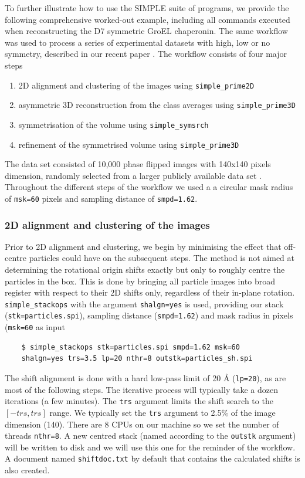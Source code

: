\documentclass[a4paper,11pt]{article}
\newcommand{\prgname}[1]{\textcolor{NavyBlue}{\texttt{#1}}}
\begin{document}
To further illustrate how to use the SIMPLE suite of programs, we provide the following comprehensive worked-out example, including all commands executed when reconstructing the D7 symmetric GroEL chaperonin. The same workflow was used to process a series of experimental datasets with high, low or no symmetry, described in our recent paper \citep{reboul2016stochastic}. The workflow consists of four major steps
\begin{enumerate}
\item 2D alignment and clustering of the images using \prgname{simple\_prime2D}
\item asymmetric 3D reconstruction from the class averages using \prgname{simple\_prime3D}
\item symmetrisation of the volume using \prgname{simple\_symsrch}
\item refinement of the symmetrised volume using \prgname{simple\_prime3D}
\end{enumerate}
The data set consisted of 10,000 phase flipped images with 140x140 pixels dimension, randomly selected from a larger publicly available data set \citep{Stagg:2008aa}. Throughout the different steps of the workflow we used a a circular mask radius of \texttt{msk=60} pixels and sampling distance of \texttt{smpd=1.62}.

\subsubsection{2D alignment and clustering of the images}
\label{2dclust}

Prior to 2D alignment and clustering, we begin by minimising the effect that off-centre particles could have on the subsequent steps. The method is not aimed at determining the rotational origin shifts exactly but only to roughly centre the particles in the box. This is done by bringing all particle images into broad register with respect to their 2D shifts only, regardless of their in-plane rotation. \prgname{simple\_stackops} with the argument \texttt{shalgn=yes} is used, providing our stack (\texttt{stk=particles.spi}), sampling distance (\texttt{smpd=1.62}) and mask radius in pixels (\texttt{msk=60} as input
\begin{verbatim}
    $ simple_stackops stk=particles.spi smpd=1.62 msk=60 
    shalgn=yes trs=3.5 lp=20 nthr=8 outstk=particles_sh.spi
\end{verbatim}
The shift alignment is done with a hard low-pass limit of 20 \AA{} (\texttt{lp=20}), as are most of the following steps. The iterative process will typically take a dozen iterations (a few minutes). The \texttt{trs} argument limits the shift search to the $[-trs,trs]$ range. We typically set the \texttt{trs} argument to 2.5\% of the image dimension (140). There are 8 CPUs on our machine so we set the number of threads \texttt{nthr=8}. A new centred stack (named according to the \texttt{outstk} argument) will be written to disk and we will use this one for the reminder of the workflow. A document named \texttt{shiftdoc.txt} by default that contains the calculated shifts is also created.
\end{document}
